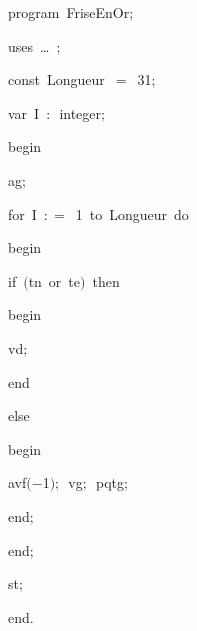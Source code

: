 
{
\parindent {}
\medskip

\carrenoir
\vspace{\neglskip}\mbox{\blc  \idt  \mcl program\idt\ FriseEnOr$;$
}\par 
\vspace{\neglskip}\mbox{\blc \blk\idt \mcl uses\idt \ \ldots\ $;$
}\par 
\pagebreak[3] 
\vspace{\neglskip}\mbox{\blc  \blk\idt  \mcl const\idt \ Longueur\ $=$\ 31$;$}\par 
\pagebreak[3] 
\vspace{\neglskip}\mbox{\blc  \blk\idt  \mcl var\idt \ I\ $:$\ integer$;$}\par 
\vspace{\neglskip}\mbox{\blc  \idt  \mcl begin\idt }\par 
\vspace{\neglskip}\mbox{\blc  \blk\idt  ag$;$}\par 
\pagebreak[3] 
\vspace{\neglskip}\mbox{\blc  \blk\idt  \mcl for\idt \ I\ $:$$=$\ 1\ \mcl to\idt \ Longueur\ \mcl do\idt }\par 
\vspace{\neglskip}\mbox{\blc  \blk\blk\idt  \mcl begin\idt \ }\par 
\pagebreak[3] 
\vspace{\neglskip}\mbox{\blc  \blk\blk\blk\idt  \mcl if\idt \ $($tn\ \mcl or\idt \ te$)$\ \mcl then\idt }\par 
\vspace{\neglskip}\mbox{\blc  \blk\blk\blk\blk\idt  \mcl begin\idt }\par 
\vspace{\neglskip}\mbox{\blc  \blk\blk\blk\blk\blk\idt  vd$;$\ }\par 
\vspace{\neglskip}\mbox{\blc  \blk\blk\blk\blk\idt  \mcl end\idt }\par 
\pagebreak[3] 
\vspace{\neglskip}\mbox{\blc  \blk\blk\blk\idt  \mcl else\idt }\par 
\vspace{\neglskip}\mbox{\blc  \blk\blk\blk\blk\idt  \mcl begin\idt }\par 
\vspace{\neglskip}\mbox{\blc  \blk\blk\blk\blk\blk\idt  avf$($$-$1$)$$;$\ vg$;$\ pqtg$;$\ }\par 
\vspace{\neglskip}\mbox{\blc  \blk\blk\blk\blk\idt  \mcl end\idt $;$}\par 
\vspace{\neglskip}\mbox{\blc  \blk\blk\idt  \mcl end\idt $;$}\par 
\vspace{\neglskip}\mbox{\blc  \blk\idt  st$;$}\par 
\vspace{\neglskip}\mbox{\blc  \idt  \mcl end\idt $.$}\par 

\medskip }

